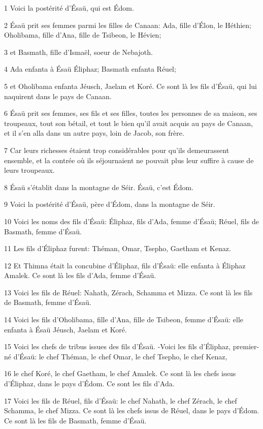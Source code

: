 \par 1 Voici la postérité d'Ésaü, qui est Édom.
\par 2 Ésaü prit ses femmes parmi les filles de Canaan: Ada, fille d'Élon, le Héthien; Oholibama, fille d'Ana, fille de Tsibeon, le Hévien;
\par 3 et Basmath, fille d'Ismaël, soeur de Nebajoth.
\par 4 Ada enfanta à Ésaü Éliphaz; Basmath enfanta Réuel;
\par 5 et Oholibama enfanta Jéusch, Jaelam et Koré. Ce sont là les fils d'Ésaü, qui lui naquirent dans le pays de Canaan.
\par 6 Ésaü prit ses femmes, ses fils et ses filles, toutes les personnes de sa maison, ses troupeaux, tout son bétail, et tout le bien qu'il avait acquis au pays de Canaan, et il s'en alla dans un autre pays, loin de Jacob, son frère.
\par 7 Car leurs richesses étaient trop considérables pour qu'ils demeurassent ensemble, et la contrée où ils séjournaient ne pouvait plus leur suffire à cause de leurs troupeaux.
\par 8 Ésaü s'établit dans la montagne de Séir. Ésaü, c'est Édom.
\par 9 Voici la postérité d'Ésaü, père d'Édom, dans la montagne de Séir.
\par 10 Voici les noms des fils d'Ésaü: Éliphaz, fils d'Ada, femme d'Ésaü; Réuel, fils de Basmath, femme d'Ésaü.
\par 11 Les fils d'Éliphaz furent: Théman, Omar, Tsepho, Gaetham et Kenaz.
\par 12 Et Thimna était la concubine d'Éliphaz, fils d'Ésaü: elle enfanta à Éliphaz Amalek. Ce sont là les fils d'Ada, femme d'Ésaü.
\par 13 Voici les fils de Réuel: Nahath, Zérach, Schamma et Mizza. Ce sont là les fils de Basmath, femme d'Ésaü.
\par 14 Voici les fils d'Oholibama, fille d'Ana, fille de Tsibeon, femme d'Ésaü: elle enfanta à Ésaü Jéusch, Jaelam et Koré.
\par 15 Voici les chefs de tribus issues des fils d'Ésaü. -Voici les fils d'Éliphaz, premier-né d'Ésaü: le chef Théman, le chef Omar, le chef Tsepho, le chef Kenaz,
\par 16 le chef Koré, le chef Gaetham, le chef Amalek. Ce sont là les chefs issus d'Éliphaz, dans le pays d'Édom. Ce sont les fils d'Ada.
\par 17 Voici les fils de Réuel, fils d'Ésaü: le chef Nahath, le chef Zérach, le chef Schamma, le chef Mizza. Ce sont là les chefs issus de Réuel, dans le pays d'Édom. Ce sont là les fils de Basmath, femme d'Ésaü.
